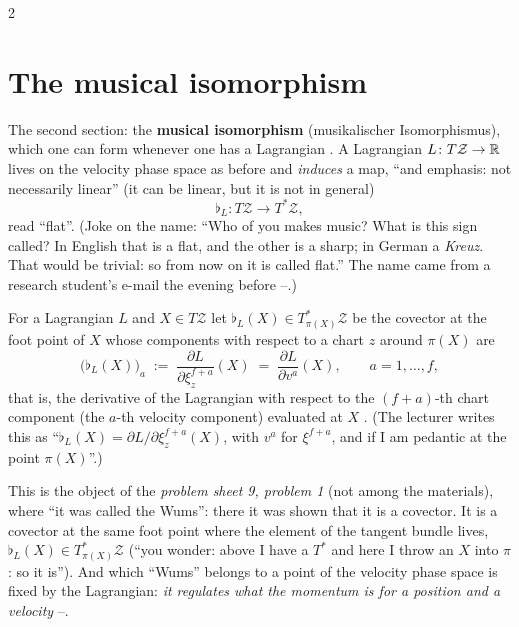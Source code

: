 \begin{paracol}{2}
\section{The musical isomorphism}\label{sec:hq-musical}

The second section: the \textbf{musical isomorphism} (musikalischer Isomorphismus), which one can form whenever one has a Lagrangian . A Lagrangian $L\colon T\mathcal Z\to\mathbb{R}$ lives on the velocity phase space as before and \emph{induces} a map, ``and emphasis: not necessarily linear'' (it can be linear, but it is not in general)
\begin{equation}\label{eq:hq-flat-sig}
  \flat_L\colon T\mathcal Z\longrightarrow T^*\mathcal Z,
\end{equation}
read ``flat''. (Joke on the name: ``Who of you makes music? What is this sign called? In English that is a flat, and the other is a sharp; in German a \emph{Kreuz}. That would be trivial: so from now on it is called flat.'' The name came from a research student's e-mail the evening before --.)

\begin{definition}\label{def:hq-flat}
For a Lagrangian $L$ and $X\in T\mathcal Z$ let $\flat_L(X)\in T^*_{\pi(X)}\mathcal Z$ be the covector at the foot point of $X$ whose components with respect to a chart $z$ around $\pi(X)$ are
\begin{equation}\label{eq:hq-flat}
  \bigl(\flat_L(X)\bigr)_a\;:=\;\frac{\partial L}{\partial\xi_z^{f+a}}(X)\;=\;\frac{\partial L}{\partial v^a}(X),\qquad a=1,\dots,f,
\end{equation}
that is, the derivative of the Lagrangian with respect to the $(f+a)$-th chart component (the $a$-th velocity component) evaluated at $X$ . (The lecturer writes this as ``$\flat_L(X)=\partial L/\partial\xi_z^{f+a}(X)$, with $v^a$ for $\xi^{f+a}$, and if I am pedantic at the point $\pi(X)$''.)
\end{definition}
\begin{coursenote}\label{cn:hq-wums}
This is the object of the \emph{problem sheet 9, problem 1} (not among the materials), where ``it was called the Wums'': there it was shown that it is a covector. It is a covector at the same foot point where the element of the tangent bundle lives, $\flat_L(X)\in T^*_{\pi(X)}\mathcal Z$ (``you wonder: above I have a $T^*$ and here I throw an $X$ into $\pi$: so it is''). And which ``Wums'' belongs to a point of the velocity phase space is fixed by the Lagrangian: \emph{it regulates what the momentum is for a position and a velocity} --.
\end{coursenote}


\end{paracol}
